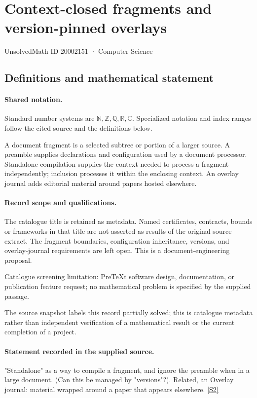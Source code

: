 \documentclass[11pt]{article}
\newcommand{\sref}[2]{\hyperlink{source:#1:#2}{[S#2]}}
\begin{document}
\setcounter{section}{20002150}
\section{Context-closed fragments and version-pinned overlays}\label{20002151}
{\small\sffamily UnsolvedMath ID 20002151 · Computer Science}
\subsection{Definitions and mathematical statement}

\paragraph{Shared notation.}Standard number systems are $\mathbb N,\mathbb Z,\mathbb Q,\mathbb R,\mathbb C$. Specialized notation and index ranges follow the cited source and the definitions below.


A document fragment is a selected subtree or portion of a larger source. A preamble supplies declarations and configuration used by a document processor. Standalone compilation supplies the context needed to process a fragment independently; inclusion processes it within the enclosing context. An overlay journal adds editorial material around papers hosted elsewhere.
\paragraph{Record scope and qualifications.}
The catalogue title is retained as metadata. Named certificates, contracts, bounds or frameworks in that title are not asserted as results of the original source extract.
The fragment boundaries, configuration inheritance, versions, and overlay-journal requirements are left open. This is a document-engineering proposal.

Catalogue screening limitation: PreTeXt software design, documentation, or publication feature request; no mathematical problem is specified by the supplied passage.

The source snapshot labels this record partially solved; this is catalogue metadata rather than independent verification of a mathematical result or the current completion of a project.
\paragraph{Statement recorded in the supplied source.}
"Standalone" as a way to compile a fragment, and ignore the preamble when in a large document. (Can this be managed by "versions"?). Related, an Overlay journal: material wrapped around a paper that appears elsewhere. \sref{20002151}{2}
\end{document}
